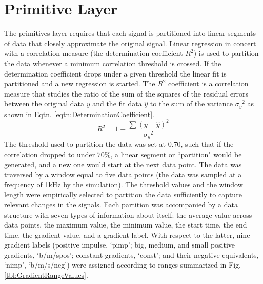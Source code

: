 \section{Primitive Layer} \label{subsec:Primitives}
The primitives layer requires that each signal is partitioned into linear segments of data that closely approximate the original signal. Linear regression in concert with a correlation measure (the determination coefficient $R^2$) is used to partition the data whenever a minimum correlation threshold is crossed. If the determination coefficient drops under a given threshold the linear fit is partitioned and a new regression is started. The $R^2$ coefficient is a correlation measure that studies the ratio of the sum of the squares of the residual errors between the original data $y$ and the fit data $\hat{y}$ to the sum of the variance $\sigma{_y}^2$ as shown in Eqtn. \ref{eqtn:DeterminationCoefficient}.
\begin{equation}
\label{eqtn:DeterminationCoefficient}
    R^2 = 1 - \frac{\sum{(y-\hat{y})^2}}{\sigma{_y}^2}
\end{equation}
The threshold used to partition the data was set at 0.70, such that if the correlation dropped to under $70\%$, a linear segment or ``partition" would be generated, and a new one would start at the next data point. The data was traversed by a window equal to five data points (the data was sampled at a frequency of 1kHz by the simulation). The threshold values and the window length were empirically selected to partition the data sufficiently to capture relevant changes in the signals.
Each partition was accompanied by a data structure with seven types of information about itself: the average value across data points, the maximum value, the minimum value, the start time, the end time, the gradient value, and a gradient label. With respect to the latter, nine gradient labels (positive impulse, `pimp'; big, medium, and small positive gradients, `b/m/spos'; constant gradients, `const'; and their negative equivalents, `nimp', `b/m/s/neg') were assigned according to ranges summarized in Fig. \ref{tbl:GradientRangeValues}.
